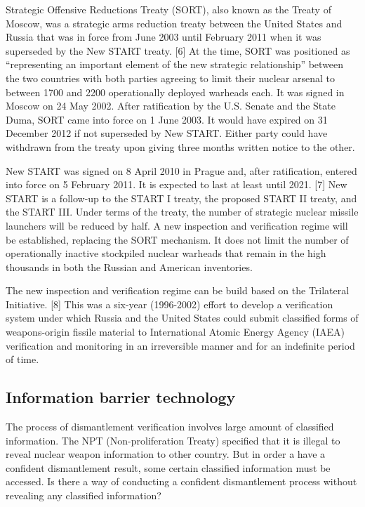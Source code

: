 \documentclass[twocolumn,a4paper]{article}
\begin{document}
Strategic Offensive Reductions Treaty (SORT), also known as the Treaty
of Moscow, was a strategic arms reduction treaty between the United 
States and Russia that was in force from June 2003 until February 2011 
when it was superseded by the New START treaty. [6] At the time, SORT 
was positioned as ``representing an important element of the new strategic
relationship'' between the two countries with both parties agreeing to 
limit their nuclear arsenal to between 1700 and 2200 operationally 
deployed warheads each. It was signed in Moscow on 24 May 2002. After
ratification by the U.S. Senate and the State Duma, SORT came into 
force on 1 June 2003. It would have expired on 31 December 2012 if 
not superseded by New START. Either party could have withdrawn from 
the treaty upon giving three months written notice to the other. 

New START was signed on 8 April 2010 in Prague and, after ratification, 
entered into force on 5 February 2011. It is expected to last at least 
until 2021. [7] New START is a follow-up to the START I treaty, the 
proposed START II treaty, and the START III. Under terms of the treaty, 
the number of strategic nuclear missile launchers will be reduced by 
half. A new inspection and verification regime will be established, 
replacing the SORT mechanism. It does not limit the number of 
operationally inactive stockpiled nuclear warheads that remain in
the high thousands in both the Russian and American inventories. 

The new inspection and verification regime can be build based on the 
Trilateral Initiative. [8] This was a six-year (1996-2002) effort to 
develop a verification system under which Russia and the United States
could submit classified forms of weapons-origin fissile material to 
International Atomic Energy Agency (IAEA) verification and monitoring
in an irreversible manner and for an indefinite period of time. 

\subsection{Information barrier technology}
The process of dismantlement verification involves large amount of 
classified information. The NPT (Non-proliferation Treaty) specified 
that it is illegal to reveal nuclear weapon information to other 
country. But in order a have a confident dismantlement result, some
certain classified information must be accessed. Is there a way of 
conducting a confident dismantlement process without revealing any 
classified information? 
\end{document}
